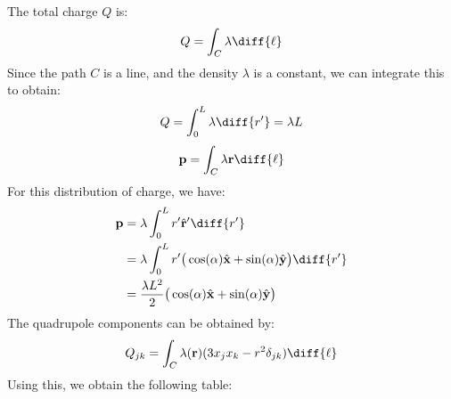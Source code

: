                 \begin{solution}
                    The total charge $Q$ is:
                    \begin{equation}
                        Q=\int_{C}\lambda\diff{\ell}
                    \end{equation}
                    Since the path $C$ is a line, and the density
                    $\lambda$ is a constant, we can integrate this
                    to obtain:
                    \begin{equation}
                        Q=\int_{0}^{L}\lambda\diff{r'}=\lambda{L}
                    \end{equation}
                    \begin{equation}
                        \mathbf{p}=\int_{C}\lambda\mathbf{r}\diff{\ell}
                    \end{equation}
                    For this distribution of charge, we have:
                    \begin{subequations}
                        \begin{align}
                            \mathbf{p}&=
                                \lambda\int_{0}^{L}r'\hat{\mathbf{r}}'
                                    \diff{r'}\\
                            &=\lambda\int_{0}^{L}r'
                                \big(\cos(\alpha)\hat{\mathbf{x}}+
                                     \sin(\alpha)\hat{\mathbf{y}}\big)
                                        \diff{r'}\\
                            &=\frac{\lambda{L}^{2}}{2}
                                \big(\cos(\alpha)\hat{\mathbf{x}}+
                                     \sin(\alpha)\hat{\mathbf{y}}\big)
                        \end{align}
                    \end{subequations}
                    The quadrupole components can be obtained by:
                    \begin{equation}
                        Q_{jk}=\int_{C}\lambda(\mathbf{r})
                            (3x_{j}x_{k}-r^{2}\delta_{jk})\diff{\ell}
                    \end{equation}
                    Using this, we obtain the following table:
                    \begin{table}[H]
                        \centering
                        \captionsetup{type=table}
                        \begin{tabular}{|c|c|c|c|}

\end{tabular}
\end{table}
\end{solution}
